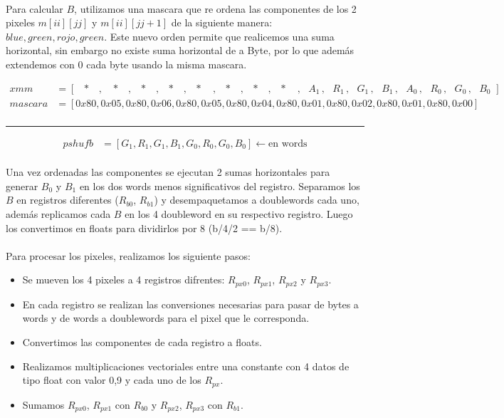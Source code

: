 \documentclass[a4paper]{article}
\begin{document}
\paragraph{}Para calcular $B$, utilizamos una mascara que re ordena las componentes de los 2 pixeles $m[ii][jj]$ y $m[ii][jj+1]$ de la siguiente manera: $blue, green, rojo, green$. Este nuevo orden permite que realicemos una suma horizontal, sin embargo no existe suma horizontal de a Byte, por lo que adem\'as extendemos con 0 cada byte usando la misma mascara.  

\begin{align*}
	xmm &= [\, \, \, \, * \, \, \, \, \, ,\, \, \, \, \, * \, \, \, \, \, ,\, \, \, \, * \, \, \, \, \, ,\, \, \, \, * \, \, \, \, \, ,\, \, \, \, * \, \, \, \, \, \, ,\, \, \, \, * \, \, \, \, \, ,\, \, \, \, * \, \, \, \, \, ,\, \, \, \, * \, \, \, \, \, \, , \, \, \, \,  A_1 \, , \, \, \, \, R_1 \, , \, \, \, \, G_1 \, , \, \, \, \, B_1 \, , \, \, \, \, A_0 \, , \, \, \, \, R_0 \, , \, \, \, \, G_0 \, , \, \, \, \, B_0 \, \,]\\
	mascara &= [0x80, 0x05, 0x80, 0x06, 0x80, 0x05, 0x80, 0x04, 0x80, 0x01, 0x80, 0x02, 0x80, 0x01, 0x80, 0x00] \\
\end{align*}
	\hrule
\begin{align*}
	pshufb &= [G_1, R_1, G_1, B_1, G_0, R_0, G_0, B_0] \leftarrow \text{en words}
\end{align*} 

\paragraph{}Una vez ordenadas las componentes se ejecutan 2 sumas horizontales para generar $B_0$ y $B_1$ en los dos words menos significativos del registro. Separamos los $B$ en registros diferentes ($R_{b0}$, $R_{b1}$) y desempaquetamos a doublewords cada uno, adem\'as replicamos cada $B$ en los 4 doubleword en su respectivo registro. Luego los convertimos en floats para dividirlos por 8 (b/4/2 == b/8).

\paragraph{} Para procesar los pixeles, realizamos los siguiente pasos:

\begin{itemize}
	\item Se mueven los 4 pixeles a 4 registros difrentes: $R_{px0}$, $R_{px1}$, $R_{px2}$ y $R_{px3}$.
	\item En cada registro se realizan las conversiones necesarias para pasar de bytes a words y de words a doublewords para el pixel que le corresponda.
	\item Convertimos las componentes de cada registro a floats.
	\item Realizamos multiplicaciones vectoriales entre una constante con 4 datos de tipo float con valor 0,9 y cada uno de los $R_{px}$.
	\item Sumamos $R_{px0}$, $R_{px1}$ con $R_{b0}$ y $R_{px2}$, $R_{px3}$ con $R_{b1}$.
\end{itemize}
\end{document}
